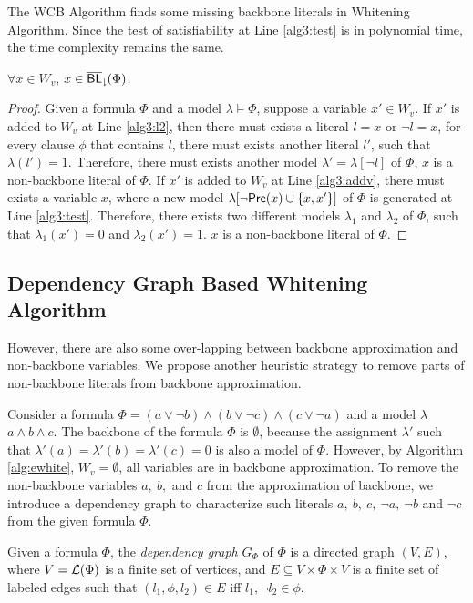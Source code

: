 The WCB Algorithm finds some missing backbone literals in Whitening Algorithm. Since the test of satisfiability at Line \ref{alg3:test} is in polynomial time, the time complexity remains the same.

\begin{theorem}
$\forall x\in W_v$, $x\in{\sf \overline{BL}_\downharpoonright}(\Phi)$.
\end{theorem}

\begin{proof}
Given a formula $\Phi$ and a model $\lambda\models\Phi$, suppose a variable $x'\in W_v$. If $x'$ is added to $W_v$ at Line \ref{alg3:l2}, then there must exists a literal $l=x$ or $\neg l=x$, for every clause $\phi$ that contains $l$, there must exists another literal $l'$, such that $\lambda(l')=1$. Therefore, there must exists another model $\lambda'=\lambda[\neg l]$ of $\Phi$, $x$ is a non-backbone literal of $\Phi$.
If $x'$ is added to $W_v$ at Line \ref{alg3:addv}, there must exists a variable $x$, where a new model $\lambda[\neg \textsf{Pre}(x)\cup \{x,x'\}]$ of $\Phi$ is generated at Line \ref{alg3:test}. Therefore, there exists two different models $\lambda_1$ and $\lambda_2$ of $\Phi$, such that $\lambda_1(x')=0$ and $\lambda_2(x')=1$. $x$ is a non-backbone literal of $\Phi$.
\end{proof}
\medskip


\iffalse
\subsection{Dependency Graph Based Whitening Algorithm}

However, there are also some over-lapping between backbone approximation and non-backbone variables. We propose another heuristic strategy to remove parts of non-backbone literals from backbone approximation.

Consider a formula $\Phi=(a\vee\neg b)\wedge(b\vee\neg c)\wedge(c\vee\neg a)$ and a model $\lambda$ $a\wedge b\wedge c$. The backbone of the formula $\Phi$ is $\emptyset$, because the assignment $\lambda'$ such that $\lambda'(a)=\lambda'(b)=\lambda'(c)=0$ is also a model of $\Phi$.
However, by Algorithm \ref{alg:ewhite}, $W_v=\emptyset$, all variables are in backbone approximation. To remove the non-backbone variables $a, \ b, $ and $c$ from the approximation of backbone, we introduce a dependency graph to characterize such literals $a, \ b, \ c, \ \neg a, \ \neg b$ and  $\neg c$ from  the given formula $\Phi$.

Given a formula $\Phi$, the \emph{dependency graph} $G_\Phi$ of $\Phi$ is a directed graph $(V,E)$, where
$V=\Lit(\Phi)$ is a finite set of vertices, and $E\subseteq V\times \Phi\times V$ is a finite set of labeled edges such that
$(l_1,\phi, l_2)\in E$ iff $l_1,\neg l_2\in \phi$.

